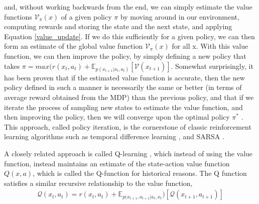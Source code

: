and, without working backwards from the end, we can simply estimate the value functions $\mathcal{V}_\pi(x)$ of a given policy $\pi$ by moving around in our environment, computing rewards and storing the state and the next state, and applying Equation \ref{value_update}. If we do this sufficiently for a given policy, we can then form an estimate of the global value function $\mathcal{V}_\pi(x)$ for all x. With this value function, we can then improve the policy, by simply defining a new policy that takes $\pi = max(r(x_t,a_t) + \mathbb{E}_{p(x_{t+1} |x_t, a_t)}[\mathcal{V}(x_{t+1})]$. Somewhat surprisingly, it has been proven that if the estimated value function is accurate, then the new policy defined in such a manner is necessarily the same or better (in terms of average reward obtained from the MDP) than the previous policy, and that if we iterate the process of sampling new states to estimate the value function, and then improving the policy, then we will converge upon the optimal policy $\pi^*$ \citep{sutton2018reinforcement}. This approach, called policy iteration, is the cornerstone of classic reinforcement learning algorithms such as temporal difference learning \citep{sutton1988learning}, and SARSA \citep{sutton1996generalization,singh1996reinforcement}.

 A closely related approach is called Q-learning \citep{watkins1992q}, which instead of using the value function, instead maintains an estimate of the state-action value function $Q(x,a)$, which is called the Q-function for historical reasons. The Q function satisfies a similar recursive relationship to the value function,
\begin{align*}
\mathcal{Q}(x_t,a_t) = r(x_t,a_t) + \mathbb{E}_{p(x_{t+1},a_{t+1} | a_t,x_t})[\mathcal{Q}(x_{t+1},a_{t+1})]
\end{align*}

